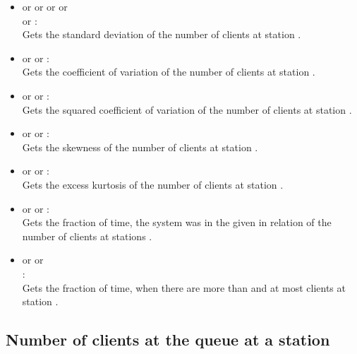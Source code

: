 \begin{itemize}
\item
{} or  or  or  or\\
 or :\\
Gets the standard deviation of the number of clients at station .

\item
{} or  or :\\
Gets the coefficient of variation of the number of clients at station .

\item
{} or  or :\\
Gets the squared coefficient of variation of the number of clients at station .

\item
{} or  or :\\
Gets the skewness of the number of clients at station .

\item
{} or  or :\\
Gets the excess kurtosis of the number of clients at station .

\item
{} or  or :\\
Gets the fraction of time, the system was in the given  in relation of the number of clients at stations .

\item
{} or  or\\
:\\
Gets the fraction of time, when there are more than  and at most  clients at station .

\end{itemize}



\subsection{Number of clients at the queue at a station}

